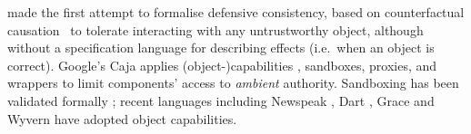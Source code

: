 








\citet{Murray10dphil} made the first attempt to formalise defensive
consistency, based on counterfactual causation~\cite{Lewis_73}
to tolerate interacting with any untrustworthy object,
although
%
%
%
without a specification language for describing effects
(i.e.\ when an object is correct).
%
%
Google's Caja \cite{Caja} applies
(object-)capabilities \cite{Dennis66,JamesMorris,MillerPhD}, 
sandboxes, proxies, and wrappers
 to limit components'
access to \textit{ambient} authority.
Sandboxing has been validated
formally %
\cite{mmt-oakland10};
recent languages %
\cite{CapJavaHayesAPLAS17,CapNetSocc17Eide,DOCaT14} including Newspeak
\cite{newspeak17}, Dart \cite{dart15}, Grace \cite{grace,graceClasses}
and Wyvern \cite{wyverncapabilities}
have adopted
object
capabilities.




